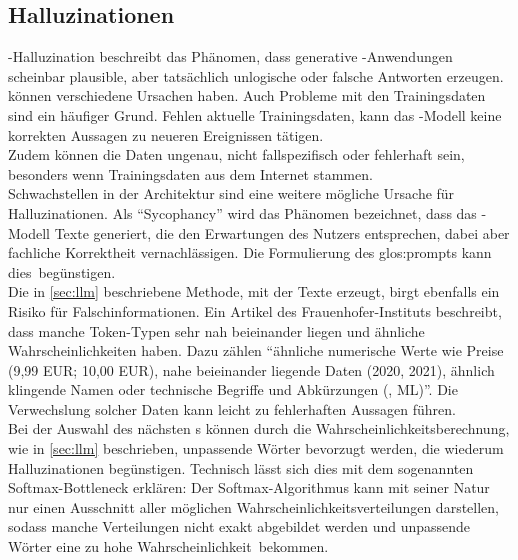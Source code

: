 \documentclass[../main.tex]{subfiles}
\begin{document}
\subsection{Halluzinationen}
 -Halluzination beschreibt 
das Phänomen, dass generative -Anwendungen scheinbar plausible, aber tatsächlich unlogische oder falsche Antworten erzeugen\cite{hallucinationForewarning}.\\
 können verschiedene Ursachen haben. Auch Probleme mit den Trainingsdaten sind ein häufiger Grund. Fehlen aktuelle Trainingsdaten, kann das -Modell keine korrekten Aussagen zu neueren Ereignissen tätigen.\\ 
Zudem können die Daten ungenau, nicht fallspezifisch oder fehlerhaft sein, besonders wenn Trainingsdaten aus dem Internet stammen.\\ 
Schwachstellen in der Architektur sind eine weitere mögliche Ursache für Halluzinationen. Als "`Sycophancy"' wird das Phänomen bezeichnet, dass das -Modell Texte 
generiert, die den Erwartungen des Nutzers entsprechen, dabei aber fachliche Korrektheit vernachlässigen. Die Formulierung des \gls{glos:prompt}s kann \mbox{dies begünstigen.\cite{allgemHalluzinationen}} \\
Die in \autoref{sec:llm} beschriebene Methode, mit der  Texte erzeugt, birgt ebenfalls ein Risiko für Falschinformationen. Ein Artikel des Frauenhofer-Instituts beschreibt, dass manche Token-Typen sehr nah beieinander liegen 
und ähnliche Wahrscheinlichkeiten haben. Dazu zählen "`ähnliche numerische Werte wie Preise (9,99 EUR; 10,00 EUR), nahe beieinander liegende Daten (2020, 2021), ähnlich klingende Namen oder 
technische Begriffe und Abkürzungen (, ML)"'\cite{halluzinationenFraunhofer}. Die Verwechslung solcher Daten kann leicht zu fehlerhaften Aussagen führen.\\
Bei der Auswahl des nächsten s können durch die Wahrscheinlichkeitsberechnung, wie in \autoref{sec:llm}  beschrieben, unpassende Wörter bevorzugt werden, die wiederum Halluzinationen 
begünstigen. Technisch lässt sich dies mit dem sogenannten Softmax-Bottleneck erklären: Der Softmax-Algorithmus kann mit seiner Natur nur einen Ausschnitt aller möglichen 
Wahrscheinlichkeitsverteilungen darstellen, sodass manche Verteilungen nicht exakt abgebildet werden und unpassende Wörter eine zu hohe \mbox{Wahrscheinlichkeit bekommen.\cite{softmax}} \\
\end{document}
